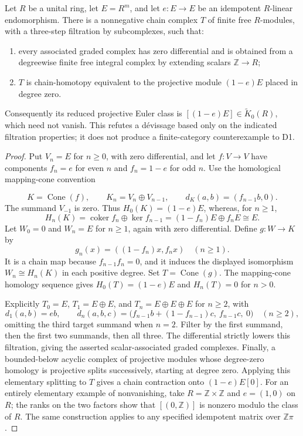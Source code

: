 \begin{proposition}
\label{D:alternating-projector}
Let $R$ be a unital ring, let $E=R^m$, and let
$e:E\to E$ be an idempotent $R$-linear endomorphism.  There is a
nonnegative chain complex $T$ of finite free $R$-modules, with a
three-step filtration by subcomplexes, such that:
\begin{enumerate}
\item every associated graded complex has zero differential and is
obtained from a degreewise finite free integral complex by extending
scalars $\mathbb Z\to R$;
\item $T$ is chain-homotopy equivalent to the projective module
$(1-e)E$ placed in degree zero.
\end{enumerate}
Consequently its reduced projective Euler class is
$[(1-e)E]\in\widetilde K_0(R)$, which need not vanish.  This refutes
a d\'evissage based only on the indicated filtration properties; it
does not produce a finite-category counterexample to D1.
\end{proposition}
\begin{proof}
Put $V_n=E$ for $n\geq0$, with zero differential, and let
$f:V\to V$ have components
$f_n=e$ for even $n$ and $f_n=1-e$ for odd $n$.
Use the homological mapping-cone convention

\[
 K=\operatorname{Cone}(f),\qquad K_n=V_n\oplus V_{n-1},
 \qquad d_K(a,b)=(f_{n-1}b,0).
\]
The summand $V_{-1}$ is zero.  Thus
$H_0(K)=(1-e)E$, whereas, for $n\geq1$,
\[
 H_n(K)=\operatorname{coker}f_n\oplus\ker f_{n-1}
       =(1-f_n)E\oplus f_nE\cong E.
\]
Let $W_0=0$ and $W_n=E$ for $n\geq1$, again with zero
differential.  Define $g:W\to K$ by
\[
 g_n(x)=((1-f_n)x,f_nx)\quad(n\geq1).
\]
It is a chain map because $f_{n-1}f_n=0$, and it induces the
displayed isomorphism $W_n\cong H_n(K)$ in each positive degree.
Set $T=\operatorname{Cone}(g)$.  The mapping-cone homology sequence
gives $H_0(T)=(1-e)E$ and $H_n(T)=0$ for $n>0$.

Explicitly $T_0=E$, $T_1=E\oplus E$, and
$T_n=E\oplus E\oplus E$ for $n\geq2$, with
\[
 d_1(a,b)=eb,\qquad
 d_n(a,b,c)=
 \bigl(f_{n-1}b+(1-f_{n-1})c,\ f_{n-1}c,\ 0\bigr)
 \quad(n\geq2),
\]
omitting the third target summand when $n=2$.  Filter by the first
summand, then the first two summands, then all three.  The differential
strictly lowers this filtration, giving the asserted scalar-associated
graded complexes.  Finally, a bounded-below acyclic complex of
projective modules whose degree-zero homology is projective splits
successively, starting at degree zero.  Applying this elementary
splitting to $T$ gives a chain contraction onto $(1-e)E[0]$.
For an entirely elementary example of nonvanishing, take
$R=\mathbb Z\times\mathbb Z$ and $e=(1,0)$ on $R$; the ranks on
the two factors show that $[(0,\mathbb Z)]$ is nonzero modulo the
class of $R$.  The same construction applies to any specified
idempotent matrix over $\mathbb Z\pi$.
\end{proof}

